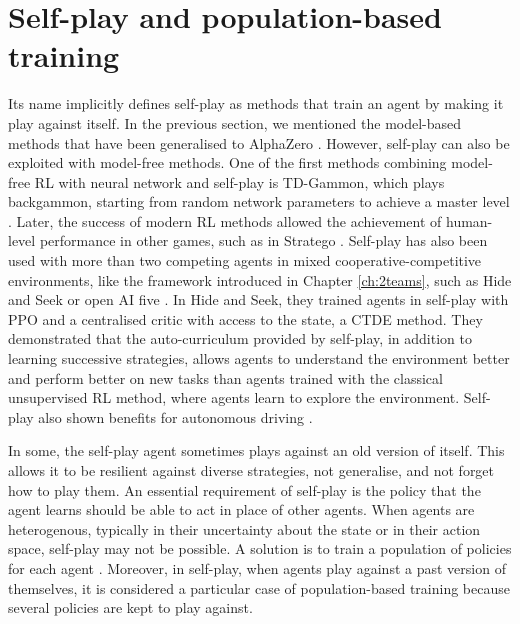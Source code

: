 \section{Self-play and population-based training}\label{sec:ch6_algo}
Its name implicitly defines self-play as methods that train an agent by making it play against itself.
In the previous section, we mentioned the model-based methods that have been generalised to AlphaZero \citep{silver2018general}.
However, self-play can also be exploited with model-free methods.
One of the first methods combining model-free RL with neural network and self-play is TD-Gammon, which plays backgammon, starting from random network parameters to achieve a master level \citep{tesauro1994td}.
Later, the success of modern RL methods allowed the achievement of human-level performance in other games, such as in Stratego \citep{stratego}.
Self-play has also been used with more than two competing agents in mixed cooperative-competitive environments, like the framework introduced in Chapter \ref{ch:2teams}, such as Hide and Seek \citep{baker2019emergent} or open AI five \citep{openai2019dota}.
In Hide and Seek, they trained agents in self-play with PPO and a centralised critic with access to the state, a CTDE method.
They demonstrated that the auto-curriculum provided by self-play, in addition to learning successive strategies, allows agents to understand the environment better and perform better on new tasks than agents trained with the classical unsupervised RL method, where agents learn to explore the environment.
Self-play also shown benefits for autonomous driving \citep{cornelisse2024humancompatible}.

In some, the self-play agent sometimes plays against an old version of itself.
This allows it to be resilient against diverse strategies, not generalise, and not forget how to play them.
An essential requirement of self-play is the policy that the agent learns should be able to act in place of other agents.
When agents are heterogenous, typically in their uncertainty about the state or in their action space, self-play may not be possible.
A solution is to train a population of policies for each agent \citep{jaderberg2017population}.
Moreover, in self-play, when agents play against a past version of themselves, it is considered a particular case of population-based training because several policies are kept to play against.

